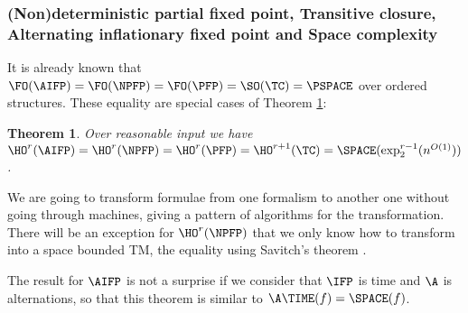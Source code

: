 \documentclass[a4paper,12pt]{article}
\newcommand{\sss}[1]{\subsubsection{#1}}
\newtheorem{theorem}{Theorem}[section]
\theoremstyle{definition}
\newcommand{\hoa}[1]{\ensuremath{\HO^{#1}}}
\begin{document}
\sss{(Non)deterministic partial fixed point, Transitive
  closure, Alternating inflationary fixed point and Space complexity}
It is already known that
$\FO(\AIFP)=\FO(\NPFP)=\FO(\PFP)=\SO(\TC)=\PSPACE$ over ordered
structures. These equality are special cases of  Theorem
\ref{space}:
\begin{theorem}\label{space}
  Over reasonable input we have $\hoa
  r(\AIFP)=\hoa{r}(\NPFP)=\hoa{r}(\PFP)=\hoa
  {r+1}(\TC)=\SPACE(\exp_{2}^{r-1}(n^{O(1)}))$ .
\end{theorem}
We are going  to transform formulae from one
formalism to another one without going through machines, giving a
pattern of algorithms for the transformation.
There will be an exception for $\hoa r(\NPFP)$ that we only know how
to transform into a space bounded TM, the equality using Savitch's
theorem \cite{Savitch}.

The result for $\AIFP$ is not a surprise if we consider that $\IFP$ is
time and $\A$ is alternations, so that this theorem is similar to
$\A\TIME(f)=\SPACE(f)$.
\end{document}
